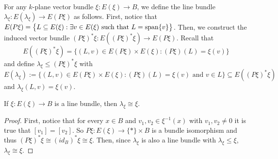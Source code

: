 \begin{definition}\label{def:lambda_xi} For any $k$-plane vector bundle $\xi:E(\xi)\to B$, we define the line bundle $\lambda_{\xi}:E(\lambda_\xi)\to E(P\xi)$ as follows. First, notice that $E(P\xi)=\big\{L\subseteq E(\xi):\exists v\in E(\xi)\text{ such that }L=\mathrm{span}\{v\}\big\}$. Then, we construct the induced vector bundle $(P\xi)^*\xi:E((P\xi)^*\xi)\to E(P\xi)$. Recall that
\[E((P\xi)^*\xi)=\big\{(L,v)\in E(P\xi)\times E(\xi):(P\xi)(L)=\xi(v)\big\}\]
and define $\lambda_{\xi}\leq(P\xi)^*\xi$ with $E(\lambda_{\xi}):=\big\{(L,v)\in E(P\xi)\times E(\xi):(P\xi)(L)=\xi(v)\text{ and }v\in L\big\}\subseteq E((P\xi)^*\xi)$ and $\lambda_{\xi}(L,v)=\xi(v)$.
\begin{center}
\end{center}
\end{definition}
\begin{remark}\label{rem:lambda_for_line_bundle} If $\xi:E(\xi)\to B$ is a line bundle, then $\lambda_\xi\cong\xi$.
\end{remark}
\begin{proof} First, notice that for every $x\in B$ and $v_1,v_2\in\xi^{-1}(x)$ with $v_1,v_2\neq 0$ it is true that $[v_1]=[v_2]$. So $P\xi:E(\xi)\to \{*\}\times B$ is a bundle isomorphism and thus $(P\xi)^*\xi\cong(id_B)^*\xi\cong\xi$. Then, since $\lambda_{\xi}$ is also a line bundle with $\lambda_{\xi}\leq\xi$, $\lambda_{\xi}\cong\xi$.
\end{proof}

